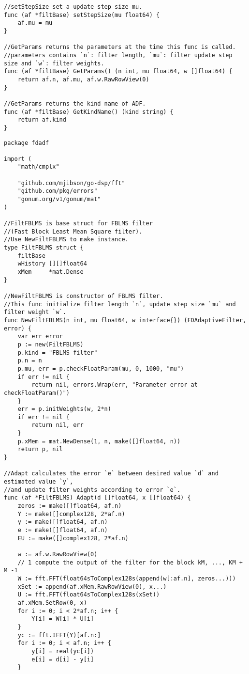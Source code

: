 \begin{lstlisting}[caption=fdadf/base.go,label=fdadf/base.go]
//setStepSize set a update step size mu.
func (af *filtBase) setStepSize(mu float64) {
    af.mu = mu
}

//GetParams returns the parameters at the time this func is called.
//parameters contains `n`: filter length, `mu`: filter update step size and `w`: filter weights.
func (af *filtBase) GetParams() (n int, mu float64, w []float64) {
    return af.n, af.mu, af.w.RawRowView(0)
}

//GetParams returns the kind name of ADF.
func (af *filtBase) GetKindName() (kind string) {
    return af.kind
}
\end{lstlisting}

\begin{lstlisting}[caption=fblms.go,label=fblms.go]
package fdadf

import (
	"math/cmplx"

	"github.com/mjibson/go-dsp/fft"
	"github.com/pkg/errors"
	"gonum.org/v1/gonum/mat"
)

//FiltFBLMS is base struct for FBLMS filter
//(Fast Block Least Mean Square filter).
//Use NewFiltFBLMS to make instance.
type FiltFBLMS struct {
	filtBase
	wHistory [][]float64
	xMem     *mat.Dense
}

//NewFiltFBLMS is constructor of FBLMS filter.
//This func initialize filter length `n`, update step size `mu` and filter weight `w`.
func NewFiltFBLMS(n int, mu float64, w interface{}) (FDAdaptiveFilter, error) {
	var err error
	p := new(FiltFBLMS)
	p.kind = "FBLMS filter"
	p.n = n
	p.mu, err = p.checkFloatParam(mu, 0, 1000, "mu")
	if err != nil {
		return nil, errors.Wrap(err, "Parameter error at checkFloatParam()")
	}
	err = p.initWeights(w, 2*n)
	if err != nil {
		return nil, err
	}
	p.xMem = mat.NewDense(1, n, make([]float64, n))
	return p, nil
}

//Adapt calculates the error `e` between desired value `d` and estimated value `y`,
//and update filter weights according to error `e`.
func (af *FiltFBLMS) Adapt(d []float64, x []float64) {
	zeros := make([]float64, af.n)
	Y := make([]complex128, 2*af.n)
	y := make([]float64, af.n)
	e := make([]float64, af.n)
	EU := make([]complex128, 2*af.n)

	w := af.w.RawRowView(0)
	// 1 compute the output of the filter for the block kM, ..., KM + M -1
	W := fft.FFT(float64sToComplex128s(append(w[:af.n], zeros...)))
	xSet := append(af.xMem.RawRowView(0), x...)
	U := fft.FFT(float64sToComplex128s(xSet))
	af.xMem.SetRow(0, x)
	for i := 0; i < 2*af.n; i++ {
		Y[i] = W[i] * U[i]
	}
	yc := fft.IFFT(Y)[af.n:]
	for i := 0; i < af.n; i++ {
		y[i] = real(yc[i])
		e[i] = d[i] - y[i]
	}


\end{lstlisting}
